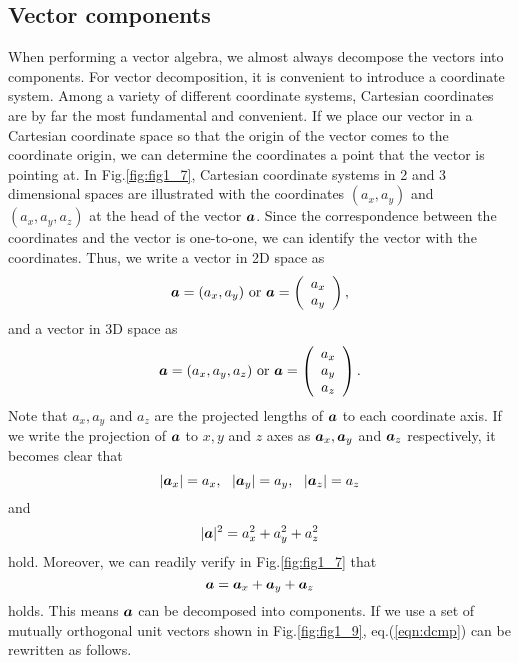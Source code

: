 \documentclass[10pt,a4j]{article}
\begin{document}
\subsection{Vector components}
When performing a vector algebra, we almost always decompose the vectors into components. For vector decomposition, it is convenient to introduce a coordinate system. Among a variety of different coordinate systems, Cartesian coordinates are by far the most fundamental and convenient.
If we place our vector in a Cartesian coordinate space so that the origin of the vector comes to the coordinate origin, we can determine the coordinates a point that the vector is pointing at. In Fig.\ref{fig:fig1_7}, Cartesian coordinate systems in 2 and 3 dimensional spaces are illustrated with the coordinates $(a_x,a_y)$ and $(a_x,a_y,a_z)$ at the head of the vector $\mbox{\boldmath $a$}$.  Since the correspondence between the coordinates and the vector is one-to-one, we can identify the vector with the coordinates. Thus, we write a vector in 2D space as 
\[
    \mbox{\boldmath $a$}=(a_x, a_y) \ {\rm or} 
    \
    \mbox{\boldmath $a$}=\left(
    \begin{array}{c}
        a_x \\
        a_y
    \end{array}
    \right), 
\]
and a vector in 3D space as 
\[
    \mbox{\boldmath $a$}=(a_x, a_y, a_z) \ {\rm or} 
    \
    \mbox{\boldmath $a$}=\left(
    \begin{array}{c}
        a_x \\
        a_y \\
        a_z
    \end{array}
    \right). 
\]
Note that $a_x, a_y$ and $a_z$ are the projected lengths of $\mbox{\boldmath $a$}$ to each coordinate axis. If we write the projection of $\mbox{\boldmath $a$}$ to $x, y$ and $z$ axes as $\mbox{\boldmath $a$}_x,\mbox{\boldmath $a$}_y$ 
and $\mbox{\boldmath $a$}_z$ respectively, it becomes clear that 
\begin{equation}
    |\mbox{\boldmath $a$}_x|=a_x, \ \ |\mbox{\boldmath $a$}_y|=a_y, \ \ |\mbox{\boldmath $a$}_z|=a_z
    \label{eqn:}
\end{equation}
and
\begin{equation}
    |\mbox{\boldmath $a$}|^2=a_x^2+a_y^2+a_z^2
    \label{eqn:}
\end{equation}
hold. Moreover, we can readily verify in Fig.\ref{fig:fig1_7} that 
\begin{equation}
    \mbox{\boldmath $a$}=\mbox{\boldmath $a$}_x+\mbox{\boldmath $a$}_y+\mbox{\boldmath $a$}_z
    \label{eqn:dcmp}
\end{equation}
holds. This means $\mbox{\boldmath $a$}$ can be decomposed into components. If we use a set of mutually orthogonal unit vectors shown in Fig.\ref{fig:fig1_9}, eq.(\ref{eqn:dcmp}) can be rewritten as follows.
\end{document}

